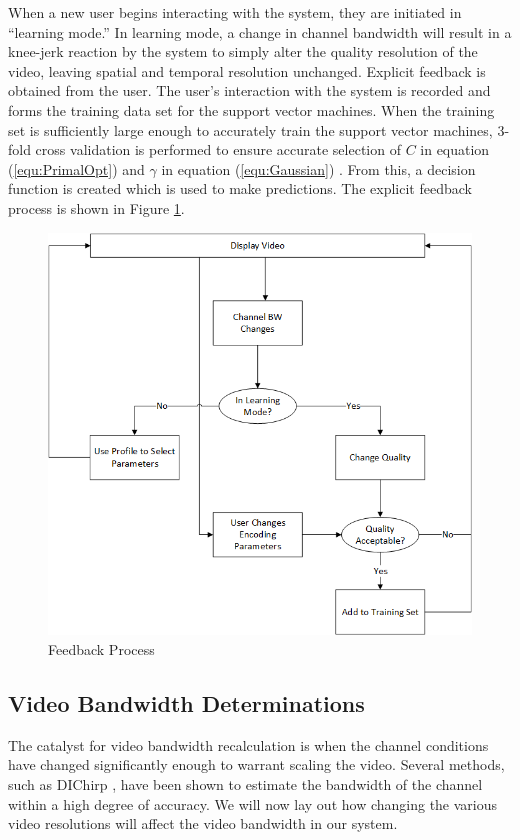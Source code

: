When a new user begins interacting with the system, they are initiated in ``learning mode.'' In learning mode, a change in channel bandwidth will result in a knee-jerk reaction by the system to simply alter the quality resolution of the video, leaving spatial and temporal resolution unchanged. Explicit feedback is obtained from the user. The user's interaction with the system is recorded and forms the training data set for the support vector machines. When the training set is sufficiently large enough to accurately train the support vector machines, 3-fold cross validation is performed to ensure accurate selection of $C$ in equation (\ref{equ:PrimalOpt}) and $\gamma$ in equation (\ref{equ:Gaussian}) \cite{LibSVM}. From this, a decision function is created which is used to make predictions. The explicit feedback process is shown in Figure \ref{fig:Feedback}.
\begin{figure}[H]
\centering
\includegraphics[width=0.5\linewidth]{images/BandwidthChangeDecisionTree.png}
\caption{Feedback Process}
\label{fig:Feedback}
\end{figure}

\subsection{Video Bandwidth Determinations}
The catalyst for video bandwidth recalculation is when the channel conditions have changed significantly enough to warrant scaling the video. Several methods, such as DIChirp \cite{DIChirp}, have been shown to estimate the bandwidth of the channel within a high degree of accuracy. We will now lay out how changing the various video resolutions will affect the video bandwidth in our system.

